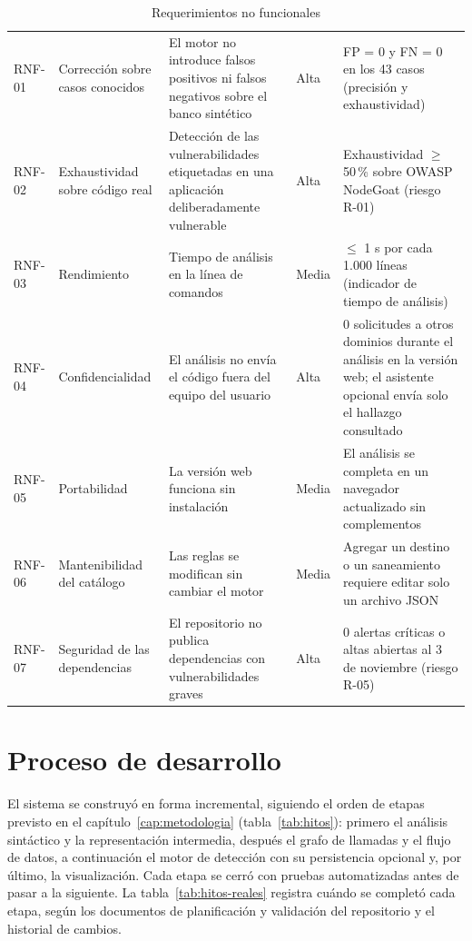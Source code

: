 \begin{table}[H]
    \centering
    \caption{Requerimientos no funcionales}
    \label{tab:rnf}
    \small
    \begin{tabularx}{\textwidth}{l L L l L}
        \toprule
         &  &  &  &  \\
        \midrule
        RNF-01 & Corrección sobre casos conocidos & El motor no introduce falsos positivos ni falsos negativos sobre el banco sintético & Alta & FP = 0 y FN = 0 en los 43 casos (precisión y exhaustividad) \\
        RNF-02 & Exhaustividad sobre código real & Detección de las vulnerabilidades etiquetadas en una aplicación deliberadamente vulnerable & Alta & Exhaustividad $\geq$ 50\,\% sobre OWASP NodeGoat (riesgo R-01) \\
        RNF-03 & Rendimiento & Tiempo de análisis en la línea de comandos & Media & $\leq$ 1 s por cada 1.000 líneas (indicador de tiempo de análisis) \\
        RNF-04 & Confidencialidad & El análisis no envía el código fuera del equipo del usuario & Alta & 0 solicitudes a otros dominios durante el análisis en la versión web; el asistente opcional envía solo el hallazgo consultado \\
        RNF-05 & Portabilidad & La versión web funciona sin instalación & Media & El análisis se completa en un navegador actualizado sin complementos \\
        RNF-06 & Mantenibilidad del catálogo & Las reglas se modifican sin cambiar el motor & Media & Agregar un destino o un saneamiento requiere editar solo un archivo JSON \\
        RNF-07 & Seguridad de las dependencias & El repositorio no publica dependencias con vulnerabilidades graves & Alta & 0 alertas críticas o altas abiertas al 3 de noviembre (riesgo R-05) \\
        \bottomrule
    \end{tabularx}
\end{table}

\section{Proceso de desarrollo}\label{sec:proceso}

El sistema se construyó en forma incremental, siguiendo el orden de
etapas previsto en el capítulo~\ref{cap:metodologia}
(tabla~\ref{tab:hitos}): primero el análisis sintáctico y la
representación intermedia, después el grafo de llamadas y el flujo de
datos, a continuación el motor de detección con su persistencia opcional
y, por último, la visualización. Cada etapa se cerró con pruebas
automatizadas antes de pasar a la siguiente. La
tabla~\ref{tab:hitos-reales} registra cuándo se completó cada etapa,
según los documentos de planificación y validación del repositorio y el
historial de cambios.

